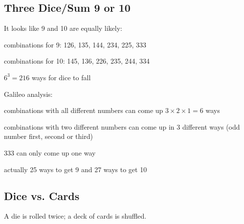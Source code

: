 \documentclass[letterpaper, landscape]{exam}
\begin{document}

  \subsection{Three Dice/Sum 9 or 10}

  It looks like 9 and 10 are equally likely:
  \begin{itemize*}
    \item combinations for 9: 126, 135, 144, 234, 225, 333
    \item combinations for 10: 145, 136, 226, 235, 244, 334
    \item $6^3 = 216$ ways for dice to fall
  \end{itemize*}

  Galileo analysis:
  \begin{itemize*}
    \item combinations with all different numbers can come up 
      $3 \times 2 \times 1 = 6$ ways
    \item combinations with two different numbers can come up in 3 different
      ways (odd number first, second or third)
    \item 333 can only come up one way
    \item actually 25 ways to get 9 and 27 ways to get 10 
  \end{itemize*}

  \subsection{Dice vs. Cards}
  A die is rolled twice; a deck of cards is shuffled.
\end{document}

